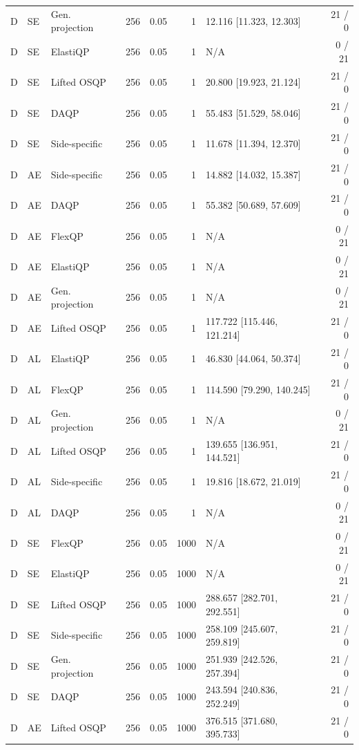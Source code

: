 \begin{longtable}{@{}lllrrrlr@{}}
D & SE & Gen. projection & 256 & 0.05 & 1 & 12.116 [11.323, 12.303] & 21 / 0 \\
D & SE & ElastiQP & 256 & 0.05 & 1 & N/A & 0 / 21 \\
D & SE & Lifted OSQP & 256 & 0.05 & 1 & 20.800 [19.923, 21.124] & 21 / 0 \\
D & SE & DAQP & 256 & 0.05 & 1 & 55.483 [51.529, 58.046] & 21 / 0 \\
D & SE & Side-specific & 256 & 0.05 & 1 & 11.678 [11.394, 12.370] & 21 / 0 \\
D & AE & Side-specific & 256 & 0.05 & 1 & 14.882 [14.032, 15.387] & 21 / 0 \\
D & AE & DAQP & 256 & 0.05 & 1 & 55.382 [50.689, 57.609] & 21 / 0 \\
D & AE & FlexQP & 256 & 0.05 & 1 & N/A & 0 / 21 \\
D & AE & ElastiQP & 256 & 0.05 & 1 & N/A & 0 / 21 \\
D & AE & Gen. projection & 256 & 0.05 & 1 & N/A & 0 / 21 \\
D & AE & Lifted OSQP & 256 & 0.05 & 1 & 117.722 [115.446, 121.214] & 21 / 0 \\
D & AL & ElastiQP & 256 & 0.05 & 1 & 46.830 [44.064, 50.374] & 21 / 0 \\
D & AL & FlexQP & 256 & 0.05 & 1 & 114.590 [79.290, 140.245] & 21 / 0 \\
D & AL & Gen. projection & 256 & 0.05 & 1 & N/A & 0 / 21 \\
D & AL & Lifted OSQP & 256 & 0.05 & 1 & 139.655 [136.951, 144.521] & 21 / 0 \\
D & AL & Side-specific & 256 & 0.05 & 1 & 19.816 [18.672, 21.019] & 21 / 0 \\
D & AL & DAQP & 256 & 0.05 & 1 & N/A & 0 / 21 \\
D & SE & FlexQP & 256 & 0.05 & 1000 & N/A & 0 / 21 \\
D & SE & ElastiQP & 256 & 0.05 & 1000 & N/A & 0 / 21 \\
D & SE & Lifted OSQP & 256 & 0.05 & 1000 & 288.657 [282.701, 292.551] & 21 / 0 \\
D & SE & Side-specific & 256 & 0.05 & 1000 & 258.109 [245.607, 259.819] & 21 / 0 \\
D & SE & Gen. projection & 256 & 0.05 & 1000 & 251.939 [242.526, 257.394] & 21 / 0 \\
D & SE & DAQP & 256 & 0.05 & 1000 & 243.594 [240.836, 252.249] & 21 / 0 \\
D & AE & Lifted OSQP & 256 & 0.05 & 1000 & 376.515 [371.680, 395.733] & 21 / 0 \\

\end{longtable}
